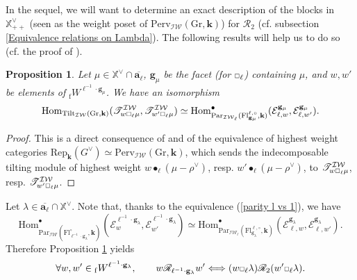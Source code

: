\documentclass[11pt]{amsart}
\theoremstyle{plain}
\newtheorem{prop}[thm]{Proposition}
\theoremstyle{remark}
\newcommand{\car}{\mbox{\relsize{-5}$\Box$}}
\numberwithin{equation}{section}
\begin{document}
	In the sequel, we will want to determine an exact description of the blocks in $\mathbb{X}^\vee_{++}$ (seen as the weight poset of $\mathrm{Perv}_{\mathcal{IW}}(\mathrm{Gr},\mathbf{k})$) for $\mathscr{R}_2$ (cf. subsection \ref{Equivalence relations on Lambda}). The following results will help us to do so (cf. the proof of \cite[Theorem 8.9]{riche2020smithtreumann}). 
	\begin{prop}\label{iso parity} Let $\mu\in\mathbb{X}^\vee\cap\overline{\mathbf{a}_\ell}$, $\mathbf{g}_\mu$ be the facet (for $\car_\ell$) containing $\mu$, and  $w,w'$ be elements of ${_\mathrm{f}W}^{\ell^{-1}\cdot\mathbf{g}_\mu}$. We have an isomorphism
		$$\mathrm{Hom}_{\mathrm{Tilt}_\mathcal{IW}(\mathrm{Gr},\mathbf{k})}(\mathscr{T}^\mathcal{IW}_{w\car_\ell\mu},\mathscr{T}^\mathcal{IW}_{w'\car_\ell\mu})\simeq \mathrm{Hom}^\bullet_{\mathrm{Par}_{\mathcal{IW}_\ell}(\mathrm{Fl}^{\ell,\circ}_{\mathbf{g}_\mu},\mathbf{k})}(\mathcal{E}_{\ell,w}^{\mathbf{g}_\mu},\mathcal{E}_{\ell,w'}^{\mathbf{g}_\mu}).$$
	\end{prop}
	\begin{proof}
		This is a direct consequence of \cite[Proposition 8.11]{riche2020smithtreumann} and of the equivalence of highest weight categories $\mathrm{Rep}_{\mathbf{k}}(G^\vee)\simeq \mathrm{Perv}_{\mathcal{IW}}(\mathrm{Gr},\mathbf{k})$, which sends the indecomposable tilting module of highest weight $w\bullet_\ell (\mu-\rho^\vee)$, resp. $w'\bullet_\ell (\mu-\rho^\vee)$, to $\mathscr{T}^\mathcal{IW}_{w\car_\ell\mu}$, resp. $\mathscr{T}^\mathcal{IW}_{w'\car_\ell\mu}$.
	\end{proof}
	Let $\lambda\in\overline{\mathbf{a}_\ell}\cap\mathbb{X}^\vee$. Note that, thanks to the equivalence (\ref{parity l vs 1}), we have 
	$$\mathrm{Hom}^\bullet_{\mathrm{Par}_{\mathcal{IW}}(\mathrm{Fl}^{\circ}_{\ell^{-1}\cdot\mathbf{g}_\lambda},\mathbf{k})}(\mathcal{E}^{\ell^{-1}\cdot\mathbf{g}_\lambda}_{w},\mathcal{E}^{\ell^{-1}\cdot\mathbf{g}_\lambda}_{w'})\simeq \mathrm{Hom}^\bullet_{\mathrm{Par}_{\mathcal{IW}_\ell}(\mathrm{Fl}^{\ell,\circ}_{\mathbf{g}_\lambda},\mathbf{k})}(\mathcal{E}^{\mathbf{g}_\lambda}_{\ell,w},\mathcal{E}^{\mathbf{g}_\lambda}_{\ell,w'}). $$
	Therefore Proposition \ref{iso parity} yields
	\begin{equation}\label{eq relation W}
		\forall w,w'\in {_\mathrm{f}W}^{\ell^{-1}\cdot\mathbf{g}_\lambda},\qquad	w \mathscr{R}_{\ell^{-1}\cdot\mathbf{g}_\lambda} w'\Longleftrightarrow (w\car_\ell\lambda)\mathscr{R}_2 (w'\car_\ell\lambda).
	\end{equation}
\end{document}
